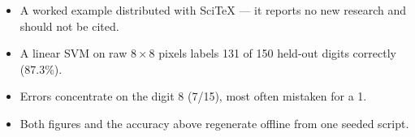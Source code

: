 \begin{itemize}
  \item A worked example distributed with SciTeX --- it reports no new research and should not be cited.
  \item A linear SVM on raw $8\times8$ pixels labels 131 of 150 held-out digits correctly (87.3\%).
  \item Errors concentrate on the digit 8 (7/15), most often mistaken for a 1.
  \item Both figures and the accuracy above regenerate offline from one seeded script.
\end{itemize}

